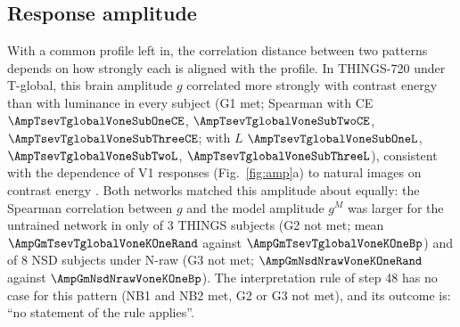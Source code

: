\subsection{Response amplitude}
\label{sec:amplitude}
With a common profile left in, the correlation distance between two patterns depends on how strongly
each is aligned with the profile. In THINGS-720 under T-global, this brain amplitude $g$ correlated more
strongly with contrast energy than with luminance in every subject (G1 met; Spearman with CE
$\AmpTsevTglobalVoneSubOneCE$, $\AmpTsevTglobalVoneSubTwoCE$, $\AmpTsevTglobalVoneSubThreeCE$; with $L$
$\AmpTsevTglobalVoneSubOneL$, $\AmpTsevTglobalVoneSubTwoL$, $\AmpTsevTglobalVoneSubThreeL$), consistent
with the dependence of V1 responses (Fig.~\ref{fig:amp}a) to natural images on contrast energy \citep{kay2013}. Both networks
matched this amplitude about equally: the Spearman correlation between $g$ and the model amplitude $g^M$
was larger for the untrained network in only \RuleGTwo{} of 3 THINGS subjects (G2 not met; mean
$\AmpGmTsevTglobalVoneKOneRand$ against $\AmpGmTsevTglobalVoneKOneBp$) and \RuleGThree{} of 8 NSD
subjects under N-raw (G3 not met; $\AmpGmNsdNrawVoneKOneRand$ against $\AmpGmNsdNrawVoneKOneBp$). The
interpretation rule of step 48 has no case for this pattern (NB1 and NB2 met, G2 or G3 not met), and its
outcome is: ``no statement of the rule applies''.


